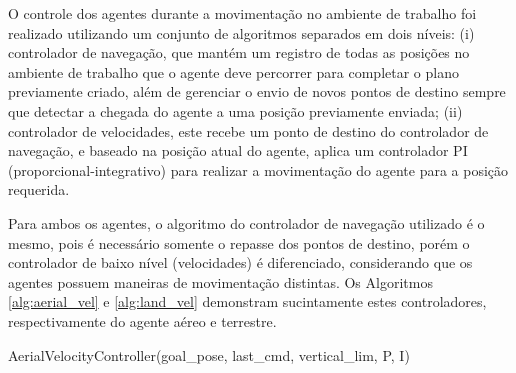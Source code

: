 O controle dos agentes durante a movimentação no ambiente de trabalho foi realizado utilizando um conjunto de algoritmos separados em dois níveis: (i) controlador de navegação, que mantém um registro de todas as posições no ambiente de trabalho que o agente deve percorrer para completar o plano previamente criado, além de gerenciar o envio de novos pontos de destino sempre que detectar a chegada do agente a uma posição previamente enviada; (ii) controlador de velocidades, este recebe um ponto de destino do controlador de navegação, e baseado na posição atual do agente, aplica um controlador PI (proporcional-integrativo) para realizar a movimentação do agente para a posição requerida.

Para ambos os agentes, o algoritmo do controlador de navegação utilizado é o mesmo, pois é necessário somente o repasse dos pontos de destino, porém o controlador de baixo nível (velocidades) é diferenciado, considerando que os agentes possuem maneiras de movimentação distintas.
Os Algoritmos \ref{alg:aerial_vel} e \ref{alg:land_vel} demonstram sucintamente estes controladores, respectivamente do agente aéreo e terrestre.

\begin{algorithm}[h]
  \caption{AerialVelocityController(goal\_pose, last\_cmd, vertical\_lim, P, I)}
  \label{alg:aerial_vel}
  \begin{algorithmic}[1]
    \STATE{}
    \STATE{}
    \STATE{}
    \ELSE
    \ENDIF
  \end{algorithmic}
\end{algorithm}

